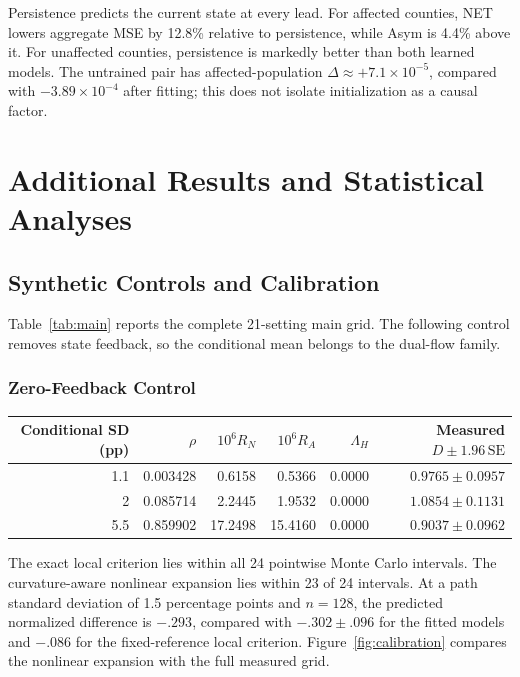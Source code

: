 Persistence predicts the current state at every lead. For affected counties, NET lowers aggregate MSE by 12.8\% relative to persistence, while Asym is 4.4\% above it. For unaffected counties, persistence is markedly better than both learned models. The untrained pair has affected-population $\Delta\approx+7.1\times10^{-5}$, compared with $-3.89\times10^{-4}$ after fitting; this does not isolate initialization as a causal factor.

\section{Additional Results and Statistical Analyses}\label{app:additional_all}
\subsection{Synthetic Controls and Calibration}\label{app:results}\label{app:curvature_checks}
Table~\ref{tab:main} reports the complete 21-setting main grid. The following control removes state feedback, so the conditional mean belongs to the dual-flow family.

\subsubsection{Zero-Feedback Control}
\begin{center}\small\begin{tabular}{@{}rrrrrr@{}}\toprule
Conditional SD (pp) & $\rho$ & $10^6R_N$ & $10^6R_A$ & $\Lambda_H$ & Measured $D\pm1.96\,\mathrm{SE}$\\\midrule
1.1 & 0.003428 & 0.6158 & 0.5366 & 0.0000 & $0.9765\pm0.0957$\\
2 & 0.085714 & 2.2445 & 1.9532 & 0.0000 & $1.0854\pm0.1131$\\
5.5 & 0.859902 & 17.2498 & 15.4160 & 0.0000 & $0.9037\pm0.0962$\\\bottomrule\end{tabular}\end{center}


The exact local criterion lies within all 24 pointwise Monte Carlo intervals. The curvature-aware nonlinear expansion lies within 23 of 24 intervals. At a path standard deviation of 1.5 percentage points and $n=128$, the predicted normalized difference is $-.293$, compared with $-.302\pm.096$ for the fitted models and $-.086$ for the fixed-reference local criterion. Figure~\ref{fig:calibration} compares the nonlinear expansion with the full measured grid.

